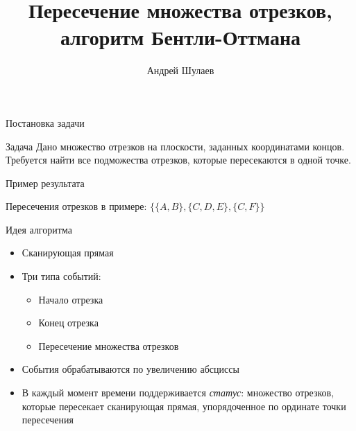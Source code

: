 \documentclass{beamer}
\title[Бентли-Оттман]{Пересечение множества отрезков, алгоритм Бентли-Оттмана}
\author[Андрей Шулаев]{Андрей Шулаев}
\institute[НИУ ИТМО]{Национальный исследовательский университет ИТ, механики и оптики}
\date{}
\begin{document}
\frame[label=title]{\titlepage}

\begin{frame}{Постановка задачи}
\begin{block}{Задача}
Дано множество отрезков на плоскости, заданных координатами концов. Требуется найти все подможества отрезков, которые пересекаются в одной точке.
\end{block}
\end{frame}

\begin{frame}{Пример результата}
\begin{center}

Пересечения отрезков в примере: $\{\{A, B\}, \{C, D, E\}, \{C, F\}\}$
\end{center}
\end{frame}


\begin{frame}{Идея алгоритма}
\begin{itemize}
\pause \item Сканирующая прямая
\pause \item Три типа событий:
\begin{itemize}
\item Начало отрезка
\item Конец отрезка
\item Пересечение множества отрезков
\end{itemize}
\pause \item События обрабатываются по увеличению абсциссы
\pause \item В каждый момент времени поддерживается \emph{статус}: множество отрезков, которые пересекает сканирующая прямая, упорядоченное по ординате точки пересечения
\end{itemize}
\end{frame}
\end{document}
